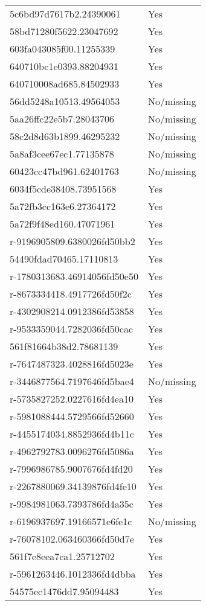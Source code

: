\begin{tabular}{ll}
5c6bd97d7617b2.24390061 & Yes \\
58bd71280f5622.23047692 & Yes \\
603fa043085f00.11255339 & Yes \\
640710bc1e0393.88204931 & Yes \\
640710008ad685.84502933 & Yes \\
56dd5248a10513.49564053 & No/missing \\
5aa26ffc22e5b7.28043706 & No/missing \\
58c2d8d63b1899.46295232 & No/missing \\
5a8af3cee67ec1.77135878 & No/missing \\
60423cc47bd961.62401763 & No/missing \\
6034f5cde38408.73951568 & Yes \\
5a72fb3cc163e6.27364172 & Yes \\
5a72f9f48ed160.47071961 & Yes \\
r-9196905809.6380026fd50bb2 & Yes \\
54490fdad70465.17110813 & Yes \\
r-1780313683.46914056fd50e50 & Yes \\
r-8673334418.4917726fd50f2c & Yes \\
r-4302908214.0912386fd53858 & Yes \\
r-9533359044.7282036fd50cac & Yes \\
561f81664b38d2.78681139 & Yes \\
r-7647487323.4028816fd5023e & Yes \\
r-3446877564.7197646fd5bae4 & No/missing \\
r-5735827252.0227616fd4ea10 & Yes \\
r-5981088444.5729566fd52660 & Yes \\
r-4455174034.8852936fd4b11c & Yes \\
r-4962792783.0096276fd5086a & Yes \\
r-7996986785.9007676fd4fd20 & Yes \\
r-2267880069.34139876fd4fe10 & Yes \\
r-9984981063.7393786fd4a35c & Yes \\
r-6196937697.19166571e6fe1c & No/missing \\
r-76078102.063460366fd50d7e & Yes \\
561f7e8eea7ca1.25712702 & Yes \\
r-5961263446.1012336fd4dbba & Yes \\
54575ec1476dd7.95094483 & Yes \\

\end{tabular}

